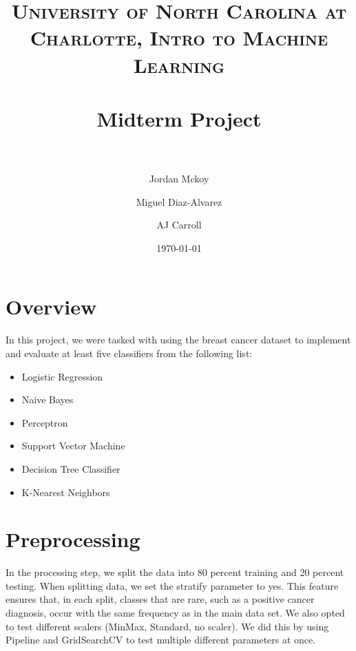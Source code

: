 \documentclass[paper=letter, fontsize=11pt]{scrartcl} %
\title{ 
\normalfont \normalsize 
\textsc{University of North Carolina at Charlotte, Intro to Machine Learning} \\ [25pt] 
\horrule{0.5pt} \\[0.4cm] 
\huge Midterm Project \\ 
\horrule{2pt} \\[0.5cm] 
}
\author{Jordan Mckoy \and Miguel Diaz-Alvarez  \and AJ Carroll}
\date{\normalsize\today}
\numberwithin{equation}{section}
\numberwithin{figure}{section}
\numberwithin{table}{section}
\begin{document}
\maketitle


\section{Overview}
In this project, we were tasked with using the breast
cancer dataset to implement and evaluate at least five classifiers
from the following list:
\begin{itemize}
    \item Logistic Regression
    \item Naive Bayes
    \item Perceptron
    \item Support Vector Machine
    \item Decision Tree Classifier
    \item K-Nearest Neighbors
\end{itemize}

\section{Preprocessing}
In the processing step, we split the data into 80 percent training and 20 percent testing.
When splitting data, we set the stratify parameter to yes. This feature ensures that, in each
split, classes that are rare, such as a positive cancer diagnosis, occur with the same frequency
as in the main data set. We also opted to test different scalers (MinMax, Standard, no scaler).
We did this by using Pipeline and GridSearchCV to test multiple different parameters at once.
\end{document}
